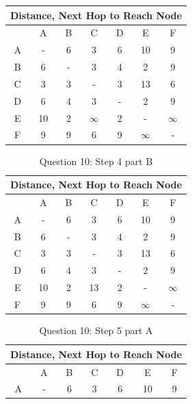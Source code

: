 \documentclass[12pt,addpoints,answers]{exam}
\begin{document}
\begin{questions}
\begin{solution}[5in]
\begin{table}[H]
\begin{tabular}{|c|c|c|c|c|c|c|}
		\hline
		\multicolumn{7}{|c|}{Distance, Next Hop to Reach Node} \\ \hline
		& A   & B   & C          & D     	& E   & F   				\\ \hline
		A    & -   & 6   & 3          & 6   & 10          & 9   \\
		B    & 6   & -   & 3          & 4   	& 2          & 9   \\
		C    & 3   & 3   & -          & 3   	& 13   & 6   \\
		D    & 6   & 4   & 3          & -   	& 2          & 9   \\
		E    & 10   & 2   & $\infty$   	& 2   & -          & $\infty$   \\
		F    & 9   & 9   & 6          & 9   	& $\infty$          & -  \\ \hline
	\end{tabular}
\end{table}
\begin{table}[H]
	\centering
	\caption{Question 10: Step 4  part B}
	\label{Solution 10}
	\begin{tabular}{|c|c|c|c|c|c|c|}
		\hline
		\multicolumn{7}{|c|}{Distance, Next Hop to Reach Node} \\ \hline
		& A   & B   & C          & D     	& E   & F   				\\ \hline
		A    & -   & 6   & 3          & 6   & 10          & 9   \\
		B    & 6   & -   & 3          & 4   	& 2          & 9   \\
		C    & 3   & 3   & -          & 3   	& 13   & 6   \\
		D    & 6   & 4   & 3          & -   	& 2          & 9   \\
		E    & 10   & 2   & 13   	& 2   & -          & $\infty$   \\
		F    & 9   & 9   & 6          & 9   	& $\infty$          & -  \\ \hline
	\end{tabular}
\end{table}
\begin{table}[H]
	\centering
	\caption{Question 10: Step 5  part A}
	\label{Solution 10}
	\begin{tabular}{|c|c|c|c|c|c|c|}
		\hline
		\multicolumn{7}{|c|}{Distance, Next Hop to Reach Node} \\ \hline
		& A   & B   & C          & D     	& E   & F   				\\ \hline
		A    & -   & 6   & 3          & 6   & 10          & 9   \\

\end{tabular}
\end{table}
\end{solution}
\end{questions}
\end{document}
